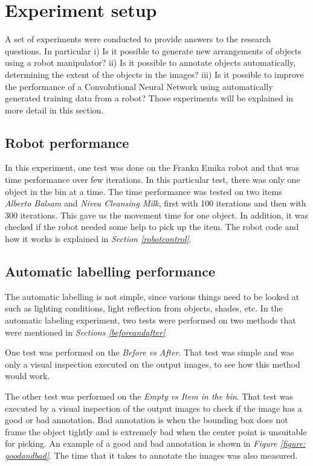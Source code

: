 \clearpage
\section{Experiment setup}
A set of experiments were conducted to provide answers to the research questions. In particular i) Is it possible to generate new arrangements of objects using a robot manipulator? ii) Is it possible to annotate objects automatically, determining the extent of the objects in the images? iii) Is it possible to improve the performance of a Convolutional Neural Network using automatically generated training data from a robot? Those experiments will be explained in more detail in this section. 
\subsection{Robot performance}
In this experiment, one test was done on the Franka Emika robot and that was time performance over few iterations. In this particular test, there was only one object in the bin at a time. The time performance was tested on two items \textit{Alberto Balsam} and \textit{Nivea Cleansing Milk}, first with 100 iterations and then with 300 iterations. This gave us the movement time for one object. In addition, it was checked if the robot needed some help to pick up the item. The robot code and how it works is explained in \textit{Section \ref{robotcontrol}}. 

\subsection{Automatic labelling performance}
The automatic labelling is not simple, since various things need to be looked at such as lighting conditions, light reflection from objects, shades, etc. 
In the automatic labeling experiment, two tests were performed on two methods that were mentioned in \textit{Sections \ref{beforeandafter}}

One test was performed on the \textit{Before vs After}. That test was simple and was only a visual inspection executed on the output images, to see how this method would work. %

The other test was performed on the \textit{Empty vs Item in the bin}. That test was executed by a visual inspection of the output images to check if the image has a good or bad annotation. Bad annotation is when the bounding box does not frame the object tightly and is extremely bad when the center point is unsuitable for picking. An example of a good and bad annotation is shown in \textit{Figure \ref{figure: goodandbad}}. The time that it takes to annotate the images was also measured.


